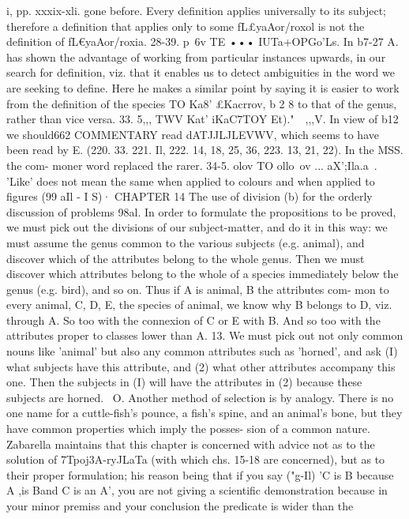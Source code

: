 {{{{{{{{{{{{{{{{{{{{{{{{{{{{{{{{{{{{{{{{{{{{{{{{{{{{{{{{{{{{{{{{{{{{i, pp. xxxix-xli.
gone before. Every definition applies universally to its subject;
therefore a definition that applies only to some fL£yaAor/roxol is
not the definition of fL€yaAor/roxia.
28-39. p~6v TE ••• IUTa+OPGo'Ls. In b7-27 A. has shown the
advantage of working from particular instances upwards, in our
search for definition, viz. that it enables us to detect ambiguities
in the word we are seeking to define. Here he makes a similar
point by saying it is easier to work from the definition of the
species {TO Ka8' £Kacrrov, b 2 8} to that of the genus, rather than
vice versa.
33. 5,,, TWV Kat' iKaC7TOY Et)."~~,,,V. In view of b12 we should662
COMMENTARY
read dATJJLJLEVWV, which seems to have been read by E. (220. 33.
221. Il, 222. 14, 18, 25, 36, 223. 13, 21, 22). In the MSS. the com-
moner word replaced the rarer.
34-5. olov TO ollo~ov ... aX';Ila.a~. 'Like' does not mean the
same when applied to colours and when applied to figures
(99 aIl - I S)·
CHAPTER 14
The use of division (b) for the orderly discussion of problems
98al. In order to formulate the propositions to be proved, we
must pick out the divisions of our subject-matter, and do it in
this way: we must assume the genus common to the various
subjects (e.g. animal), and discover which of the attributes belong
to the whole genus. Then we must discover which attributes
belong to the whole of a species immediately below the genus
(e.g. bird), and so on. Thus if A is animal, B the attributes com-
mon to every animal, C, D, E, the species of animal, we know why
B belongs to D, viz. through A. So too with the connexion of
C or E with B. And so too with the attributes proper to classes
lower than A.
13. We must pick out not only common nouns like 'animal'
but also any common attributes such as 'horned', and ask (I)
what subjects have this attribute, and (2) what other attributes
accompany this one. Then the subjects in (I) will have the
attributes in (2) because these subjects are horned.
~O. Another method of selection is by analogy. There is no
one name for a cuttle-fish's pounce, a fish's spine, and an animal's
bone, but they have common properties which imply the posses-
sion of a common nature.
Zabarella maintains that this chapter is concerned with advice
not as to the solution of 7Tpoj3A-ryJLaTa (with which chs. 15-18 are
concerned), but as to their proper formulation; his reason being
that if you say ("g-Il) 'C is B because A ,is Band C is an A',
you are not giving a scientific demonstration because in your
minor premiss and your conclusion the predicate is wider than the
}}}}}}}}}}}}}}}}}}}}}}}}}}}}}}}}}}}}}}}}}}}}}}}}}}}}}}}}}}}}}}}}}}}}
